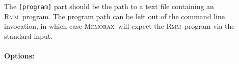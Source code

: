 \documentclass[a4paper]{article}
\newcommand{\memorax}{\textsc{Memorax}}
\newcommand{\rmm}{\textsc{Rmm}}
\begin{document}
The {\tt [program]} part should be the path to a text file containing
an \rmm\ program. The program path can be left out of the command line
invocation, in which case \memorax\ will expect the \rmm\ program via
the standard input.

\newcommand{\explainrff}{Converting an \rmm\ program to register free
  form, means to rewrite it such that the values of the registers are
  encoded in the control states, and all registers are replaced by the
  corresponding integer literals wherever they occur in
  instructions. This conversion is possible when all registers in the
  program have finite domains. Converting a program to register free
  form may be beneficial for analysis time, in particular when using
  the SB and DUAL abstractions.}

\paragraph{Options:}
\end{document}

